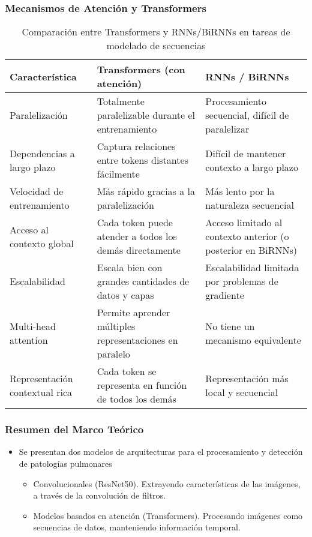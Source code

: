 \begin{frame}
\frametitle{Mecanismos de Atención y Transformers}
\begin{table}[h!]
    \centering
    \fontsize{7}{8}\selectfont
    \begin{tabular}{|p{2.5cm}|p{3cm}|p{3cm}|}
        \hline
        \textbf{Característica} & \textbf{Transformers (con atención)} & \textbf{RNNs / BiRNNs} \\
        \hline
        Paralelización & Totalmente paralelizable durante el entrenamiento & Procesamiento secuencial, difícil de paralelizar \\
        \hline
        Dependencias a largo plazo & Captura relaciones entre tokens distantes fácilmente & Difícil de mantener contexto a largo plazo \\
        \hline
        Velocidad de entrenamiento & Más rápido gracias a la paralelización & Más lento por la naturaleza secuencial \\
        \hline
        Acceso al contexto global & Cada token puede atender a todos los demás directamente & Acceso limitado al contexto anterior (o posterior en BiRNNs) \\
        \hline
        Escalabilidad & Escala bien con grandes cantidades de datos y capas & Escalabilidad limitada por problemas de gradiente \\
        \hline
        Multi-head attention & Permite aprender múltiples representaciones en paralelo & No tiene un mecanismo equivalente \\
        \hline
        Representación contextual rica & Cada token se representa en función de todos los demás & Representación más local y secuencial \\
        \hline
    \end{tabular}
    \caption{Comparación entre Transformers y RNNs/BiRNNs en tareas de modelado de secuencias}
    \label{tab:comparacion_transformers_rnns}
\end{table}
\end{frame}

\begin{frame}
\frametitle{Resumen del Marco Teórico}
\begin{itemize}
    \item Se presentan dos modelos de arquitecturas para el procesamiento y detección de patologías pulmonares
        \begin{itemize}
            \item Convolucionales (ResNet50). Extrayendo características de las imágenes, a través de la convolución de filtros.
            \item Modelos basados en atención (Transformers). Procesando imágenes como secuencias de datos, manteniendo información temporal.
        \end{itemize}
\end{itemize}
\end{frame}

